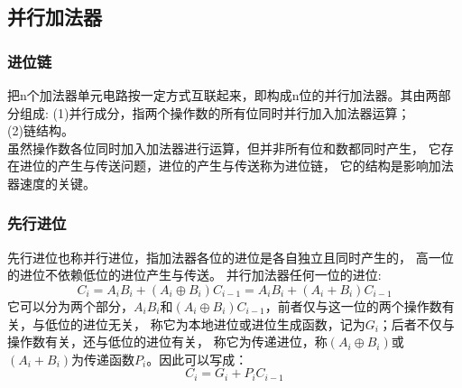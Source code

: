 \documentclass[a4paper,11pt,UTF8]{ctexart}
\begin{document}
 \subsection{并行加法器}
  \subsubsection{进位链}
  把n个加法器单元电路按一定方式互联起来，即构成n位的并行加法器。其由两部分组成:
  (1)并行成分，指两个操作数的所有位同时并行加入加法器运算；\\
  (2)链结构。\\
  虽然操作数各位同时加入加法器进行运算，但并非所有位和数都同时产生，
  它存在进位的产生与传送问题，进位的产生与传送称为进位链，
  它的结构是影响加法器速度的关键。
  \subsubsection{先行进位}
  先行进位也称并行进位，指加法器各位的进位是各自独立且同时产生的，
  高一位的进位不依赖低位的进位产生与传送。
  并行加法器任何一位的进位:
  \begin{equation}
    C_i=A_iB_i+(A_i\oplus B_i)C_{i-1}=A_iB_i+(A_i+B_i)C_{i-1}
  \end{equation}
  它可以分为两个部分，$A_iB_i$和$(A_i\oplus B_i)C_{i-1}$，前者仅与这一位的两个操作数有关，与低位的进位无关，
  称它为本地进位或进位生成函数，记为$G_i$；后者不仅与操作数有关，还与低位的进位有关，
  称它为传递进位，称$(A_i\oplus B_i)$或$(A_i+B_i)$为传递函数$P_i$。因此可以写成：
  \begin{equation}
    C_i=G_i+P_iC_{i-1}
  \end{equation}
\end{document}

